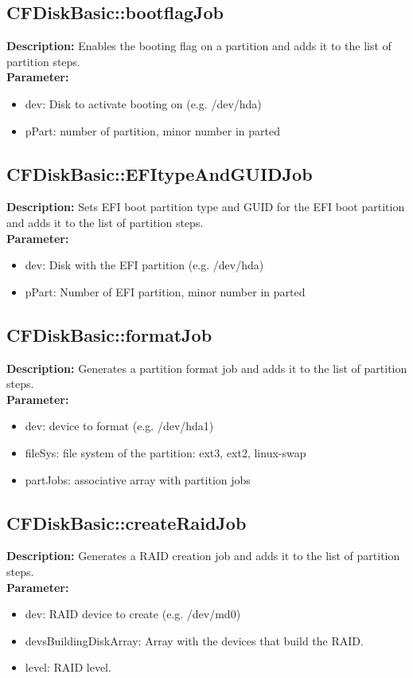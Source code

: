 \subsection{CFDiskBasic::bootflagJob}
\textbf{Description:} Enables the booting flag on a partition and adds it to the list of partition steps.\\
\textbf{Parameter:}
\begin{itemize}
\item dev: Disk to activate booting on (e.g. /dev/hda)
\item pPart: number of partition, minor number in parted
\end{itemize}

\subsection{CFDiskBasic::EFItypeAndGUIDJob}
\textbf{Description:} Sets EFI boot partition type and GUID for the EFI boot partition and adds it to the list of partition steps.\\
\textbf{Parameter:}
\begin{itemize}
\item dev: Disk with the EFI partition (e.g. /dev/hda)
\item pPart: Number of EFI partition, minor number in parted
\end{itemize}

\subsection{CFDiskBasic::formatJob}
\textbf{Description:} Generates a partition format job and adds it to the list of partition steps.\\
\textbf{Parameter:}
\begin{itemize}
\item dev: device to format (e.g. /dev/hda1)
\item fileSys: file system of the partition: ext3, ext2, linux-swap
\item partJobs: associative array with partition jobs
\end{itemize}

\subsection{CFDiskBasic::createRaidJob}
\textbf{Description:} Generates a RAID creation job and adds it to the list of partition steps.\\
\textbf{Parameter:}
\begin{itemize}
\item dev: RAID device to create (e.g. /dev/md0)
\item devsBuildingDiskArray: Array with the devices that build the RAID.
\item level: RAID level.
\end{itemize}

